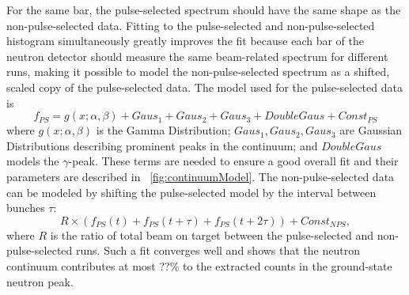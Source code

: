 For the same bar, the pulse-selected spectrum should have the same shape as the non-pulse-selected data.  Fitting to the pulse-selected and non-pulse-selected histogram simultaneously greatly improves the fit because each bar of the neutron detector should measure the same beam-related spectrum for different runs, making it possible to model the non-pulse-selected spectrum as a shifted, scaled copy of the pulse-selected data.  The model used for the pulse-selected data is
\begin{equation}
f_{PS} = g(x;\alpha,\beta) + Gaus_1 + Gaus_2 + Gaus_3 + DoubleGaus + Const_{PS}
\end{equation}
where $g(x;\alpha,\beta)$ is the Gamma Distribution; $Gaus_1, Gaus_2, Gaus_3$ are Gaussian Distributions describing prominent peaks in the continuum; and $DoubleGaus$ models the $\gamma$-peak.  These terms are needed to ensure a good overall fit and their parameters are described in {\fig}~\ref{fig:continuumModel}.  The non-pulse-selected data can be modeled by shifting the pulse-selected model by the interval between bunches $\tau$:
\begin{equation}
R\times(f_{PS}(t) + f_{PS}(t+\tau) + f_{PS}(t+2\tau)) + Const_{NPS},
\label{eq:NPS_model}
\end{equation}
where $R$ is the ratio of total beam on target between the pulse-selected and non-pulse-selected runs.  Such a fit converges well and shows that the neutron continuum contributes at most ??\% to the extracted counts in the ground-state neutron peak.  

